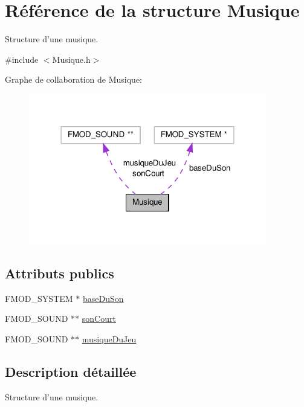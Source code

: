 \hypertarget{structMusique}{\section{Référence de la structure Musique}
\label{structMusique}
}


Structure d'une musique.  




{\ttfamily \#include $<$Musique.\-h$>$}



Graphe de collaboration de Musique\-:\nopagebreak
\begin{figure}[H]
\begin{center}
\leavevmode
\includegraphics[width=294pt]{structMusique__coll__graph}
\end{center}
\end{figure}
\subsection*{Attributs publics}
\begin{DoxyCompactItemize}
\item 
F\-M\-O\-D\-\_\-\-S\-Y\-S\-T\-E\-M $\ast$ \hyperlink{structMusique_a5ac7591cc431a2ef548d48e9cf858d94}{base\-Du\-Son}
\item 
F\-M\-O\-D\-\_\-\-S\-O\-U\-N\-D $\ast$$\ast$ \hyperlink{structMusique_ae957f32de4befa0f625f4b7229e3d660}{son\-Court}
\item 
F\-M\-O\-D\-\_\-\-S\-O\-U\-N\-D $\ast$$\ast$ \hyperlink{structMusique_a442e0e2e689699e3bb72eb8c8e4e14c2}{musique\-Du\-Jeu}
\end{DoxyCompactItemize}


\subsection{Description détaillée}
Structure d'une musique. 

